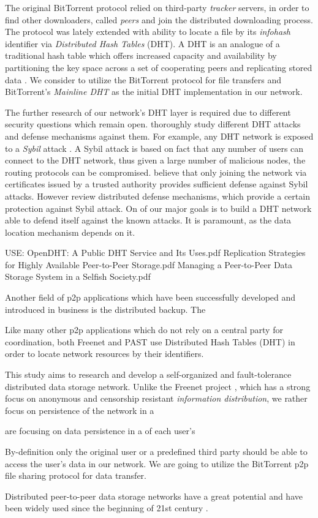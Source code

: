 The original BitTorrent protocol relied on third-party \emph{tracker}
servers, in order to find other downloaders, called \emph{peers} and
join the distributed downloading process.
The protocol was lately extended with ability to locate a file by
its \emph{infohash} identifier via \emph{Distributed Hash Tables} (DHT).
A DHT is an analogue of a traditional hash table which offers increased
capacity and availability by partitioning the key space across a set
of cooperating peers and replicating stored data \cite{opendht}.
We consider to utilize the BitTorrent protocol for file transfers
and BitTorrent's \emph{Mainline DHT} \citep{bittorrent-dht} as the
initial DHT implementation in our network.

The further research of our network's DHT layer is required due to
different security questions which remain open.
\citet{dht-security-survey} thoroughly study different DHT attacks
and defense mechanisms against them. For example, any
DHT network is exposed to a \emph{Sybil} attack \citep{sybil}.
A Sybil attack is based on fact that any number of users can
connect to the DHT network, thus given a large number of
malicious nodes, the routing protocols can be compromised.
\citet{dht-security-survey} believe that only joining the network
via certificates issued by a trusted authority provides sufficient
defense against Sybil attacks. However \citet{dht-security-survey}
review distributed defense mechanisms, which provide a
certain protection against Sybil attack.
On of our major goals is to build a DHT network able to defend itself
against the known attacks. It is paramount, as the data location
mechanism depends on it.


USE:
OpenDHT: A Public DHT Service and Its Uses.pdf
Replication Strategies for Highly Available Peer-to-Peer Storage.pdf
Managing a Peer-to-Peer Data Storage System in a Selfish Society.pdf


Another field of p2p applications which have been successfully developed
and introduced in business is the distributed backup. The

Like many other p2p applications which do not rely on a central party
for coordination, both Freenet and PAST use Distributed Hash Tables (DHT)
in order to locate network resources by their identifiers.

This study aims to research and develop a self-organized and fault-tolerance
distributed data storage network. Unlike the Freenet project \cite{freenet},
which has a strong focus on anonymous and censorship resistant \emph{information
distribution}, we rather focus on persistence of the network in a

  are focusing on data persistence in a  of each user's

By-definition only the original user
or a predefined third party should be able to access the user's data
in our network. We are going to utilize the BitTorrent \cite{bittorrent-ma}
p2p file sharing protocol for data transfer.


Distributed peer-to-peer data storage networks have a great potential and have
been widely used since the beginning of 21st century
\cite{chord-01}.
